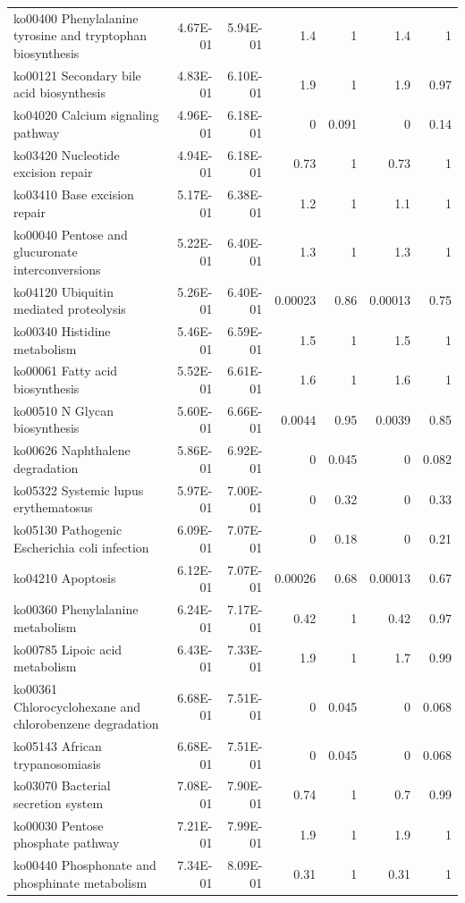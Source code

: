 {\begin{longtable}{ | l | r | r | r | r | r | r  | }
		ko00400 Phenylalanine tyrosine and tryptophan biosynthesis & 4.67E-01 & 5.94E-01 & 1.4 & 1 & 1.4 & 1\\ 
		ko00121 Secondary bile acid biosynthesis & 4.83E-01 & 6.10E-01 & 1.9 & 1 & 1.9 & 0.97\\ 
		ko04020 Calcium signaling pathway & 4.96E-01 & 6.18E-01 & 0 & 0.091 & 0 & 0.14\\ 
		ko03420 Nucleotide excision repair & 4.94E-01 & 6.18E-01 & 0.73 & 1 & 0.73 & 1\\ 
		ko03410 Base excision repair & 5.17E-01 & 6.38E-01 & 1.2 & 1 & 1.1 & 1\\ 
		ko00040 Pentose and glucuronate interconversions & 5.22E-01 & 6.40E-01 & 1.3 & 1 & 1.3 & 1\\ 
		ko04120 Ubiquitin mediated proteolysis & 5.26E-01 & 6.40E-01 & 0.00023 & 0.86 & 0.00013 & 0.75\\ 
		ko00340 Histidine metabolism & 5.46E-01 & 6.59E-01 & 1.5 & 1 & 1.5 & 1\\ 
		ko00061 Fatty acid biosynthesis & 5.52E-01 & 6.61E-01 & 1.6 & 1 & 1.6 & 1\\ 
		ko00510 N Glycan biosynthesis & 5.60E-01 & 6.66E-01 & 0.0044 & 0.95 & 0.0039 & 0.85\\ 
		ko00626 Naphthalene degradation & 5.86E-01 & 6.92E-01 & 0 & 0.045 & 0 & 0.082\\ 
		ko05322 Systemic lupus erythematosus & 5.97E-01 & 7.00E-01 & 0 & 0.32 & 0 & 0.33\\ 
		ko05130 Pathogenic Escherichia coli infection & 6.09E-01 & 7.07E-01 & 0 & 0.18 & 0 & 0.21\\ 
		ko04210 Apoptosis & 6.12E-01 & 7.07E-01 & 0.00026 & 0.68 & 0.00013 & 0.67\\ 
		ko00360 Phenylalanine metabolism & 6.24E-01 & 7.17E-01 & 0.42 & 1 & 0.42 & 0.97\\ 
		ko00785 Lipoic acid metabolism & 6.43E-01 & 7.33E-01 & 1.9 & 1 & 1.7 & 0.99\\ 
		ko00361 Chlorocyclohexane and chlorobenzene degradation & 6.68E-01 & 7.51E-01 & 0 & 0.045 & 0 & 0.068\\ 
		ko05143 African trypanosomiasis & 6.68E-01 & 7.51E-01 & 0 & 0.045 & 0 & 0.068\\ 
		ko03070 Bacterial secretion system & 7.08E-01 & 7.90E-01 & 0.74 & 1 & 0.7 & 0.99\\ 
		ko00030 Pentose phosphate pathway & 7.21E-01 & 7.99E-01 & 1.9 & 1 & 1.9 & 1\\ 
		ko00440 Phosphonate and phosphinate metabolism & 7.34E-01 & 8.09E-01 & 0.31 & 1 & 0.31 & 1\\ 

\end{longtable}}
